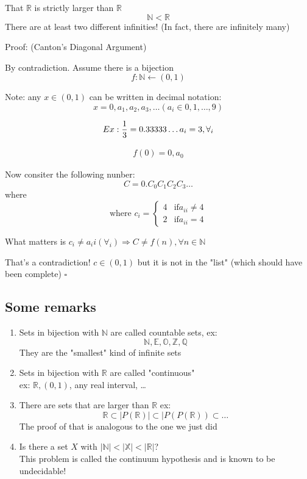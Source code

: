 \documentclass{article}
\begin{document}
That $\mathbb{R}$ is strictly larger than $\mathbb{R}$
\[\mathbb{N} < \mathbb{R}\]
There are at least two different infinities! (In fact, there are infinitely many)

Proof: (Canton's Diagonal Argument)

By contradiction. Assume there is a bijection
\[f:\mathbb{N} \leftarrow (0,1)\]

Note: any $x \in (0,1)$ can be written in decimal notation:
\[x = 0, a_1, a_2, a_3, \ldots (a_i \in 0, 1, \ldots, 9)\]

\[Ex: \frac{1}{3} = 0.33333\ldots \\
    a_i = 3, \forall_i\]

\begin{align*}
    f(0) = 0, a_0
\end{align*}

Now consiter the following nunber: \[C = 0.C_0C_1C_2C_3\ldots\]
where
\begin{equation}
    \text{where } c_i =
    \begin{cases}
        4 & \text{if} a_{ii} \neq 4 \\
        2 & \text{if} a_{ii} = 4
    \end{cases}
\end{equation}

What matters is $c_i \neq a_ii (\forall_i) \Rightarrow C \neq f(n), \forall n \in \mathbb{N}$

That's a contradiction!
$c \in (0,1)$ but it is not in the "list" (which should have been complete) $\square$

\subsection{Some remarks}
\begin{enumerate}
    \item Sets in bijection with $\mathbb{N}$ are called countable sets, ex:
          \[\mathbb{N}, \mathbb{E}, \mathbb{O}, \mathbb{Z}, \mathbb{Q}\]
          They are the "smallest" kind of infinite sets
    \item Sets in bijection with $\mathbb{R}$ are called "continuous" \\
          ex: $\mathbb{R}, (0,1)$, any real interval, \ldots
    \item There are sets that are larger than $\mathbb{R}$ ex: \\
          \[\mathbb{R} \subset |P(\mathbb{R})| \subset |P(P(\mathbb{R})) \subset \ldots\]
          The proof of that is analogous to the one we just did
    \item Is there a set $X$ with $|\mathbb{N}| < |\mathbb{X}| < |\mathbb{R}|$? \\
          This problem is called the continuum hypothesis and is known to be undecidable!
\end{enumerate}
\end{document}
